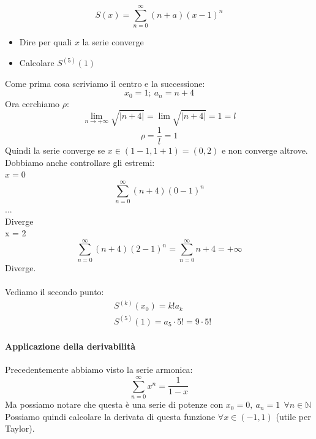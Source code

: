 \begin{esempio}[Esercizio]
  \begin{displaymath}
    S(x)=\displaystyle\sum_{n=0}^{\infty}(n+a)(x-1)^n
  \end{displaymath}
  \begin{itemize}
    \item Dire per quali $x$ la serie converge
    \item Calcolare $S^{(5)}(1)$
  \end{itemize}

  Come prima cosa scriviamo il centro e la successione:
  \begin{displaymath}
    x_0=1;\ a_n=n+4
  \end{displaymath}
  Ora cerchiamo $\rho$:
  \begin{displaymath}
    \lim_{n\to+\infty}\sqrt{|n+4|}=\lim \sqrt{|n+4|}=1=l
  \end{displaymath}
  \begin{displaymath}
    \rho = \frac{1}{l}=1
  \end{displaymath}
  Quindi la serie converge se $x\in(1-1,1+1)=(0,2)$ e non converge altrove. Dobbiamo anche controllare gli estremi: \\ $x=0$
  \begin{displaymath}
    \sum_{n=0}^{\infty}(n+4)(0-1)^n
  \end{displaymath}
  ...\\ Diverge\\ x = 2\\

  \begin{displaymath}
    \sum_{n=0}^{\infty}(n+4)(2-1)^n = \sum_{n=0}^{\infty}n+4=+\infty
  \end{displaymath}
  Diverge.\\\\
  Vediamo il secondo punto:
  \begin{align}
    &S^{(k)}(x_0)=k!a_k \label{deriv_serie} \\
    &S^{(5)}(1)=a_5\cdot5!=9\cdot 5!
  \end{align}
\end{esempio}

\paragraph{Applicazione della derivabilità}

Precedentemente abbiamo visto la serie armonica:
\begin{displaymath}
  \sum_{n=0}^{\infty}x^n=\frac{1}{1-x}
\end{displaymath}
Ma possiamo notare che questa è una serie di potenze con $x_0=0,\ a_n=1\ \ \forall n\in \mathbb{N}$
Possiamo quindi calcolare la derivata di questa funzione $\forall x\in(-1,1)$ (utile per Taylor).
